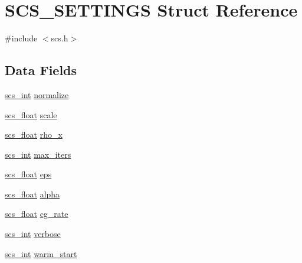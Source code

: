 \hypertarget{struct_s_c_s___s_e_t_t_i_n_g_s}{\section{S\-C\-S\-\_\-\-S\-E\-T\-T\-I\-N\-G\-S Struct Reference}
\label{struct_s_c_s___s_e_t_t_i_n_g_s}
}


{\ttfamily \#include $<$scs.\-h$>$}

\subsection*{Data Fields}
\begin{DoxyCompactItemize}
\item 
\hyperlink{glbopts_8h_a23c48a83ce0c58783595ad45ffcaf76b}{scs\-\_\-int} \hyperlink{struct_s_c_s___s_e_t_t_i_n_g_s_a2f2deca4a4fe625934880f425c3a3375}{normalize}
\item 
\hyperlink{glbopts_8h_ad37836e6404bb2c3ae8adcc6290699b9}{scs\-\_\-float} \hyperlink{struct_s_c_s___s_e_t_t_i_n_g_s_ab2b6a1ce51f2136cd86fa83c556115db}{scale}
\item 
\hyperlink{glbopts_8h_ad37836e6404bb2c3ae8adcc6290699b9}{scs\-\_\-float} \hyperlink{struct_s_c_s___s_e_t_t_i_n_g_s_aaf8bbb4248e038a2d12aca22175cf378}{rho\-\_\-x}
\item 
\hyperlink{glbopts_8h_a23c48a83ce0c58783595ad45ffcaf76b}{scs\-\_\-int} \hyperlink{struct_s_c_s___s_e_t_t_i_n_g_s_ab85a3495a03980ebb813b017fef244e0}{max\-\_\-iters}
\item 
\hyperlink{glbopts_8h_ad37836e6404bb2c3ae8adcc6290699b9}{scs\-\_\-float} \hyperlink{struct_s_c_s___s_e_t_t_i_n_g_s_af831b18f2e8eea852b3eec22b7413c49}{eps}
\item 
\hyperlink{glbopts_8h_ad37836e6404bb2c3ae8adcc6290699b9}{scs\-\_\-float} \hyperlink{struct_s_c_s___s_e_t_t_i_n_g_s_a844e3c29e5e72550896d01c9ca745081}{alpha}
\item 
\hyperlink{glbopts_8h_ad37836e6404bb2c3ae8adcc6290699b9}{scs\-\_\-float} \hyperlink{struct_s_c_s___s_e_t_t_i_n_g_s_a4549b5528b3b3ed290427b36e737ea13}{cg\-\_\-rate}
\item 
\hyperlink{glbopts_8h_a23c48a83ce0c58783595ad45ffcaf76b}{scs\-\_\-int} \hyperlink{struct_s_c_s___s_e_t_t_i_n_g_s_a6f332a476fcf237bfc3ebc99124a24ae}{verbose}
\item 
\hyperlink{glbopts_8h_a23c48a83ce0c58783595ad45ffcaf76b}{scs\-\_\-int} \hyperlink{struct_s_c_s___s_e_t_t_i_n_g_s_a38a4b68bc0363f4dd0737ae5621388ae}{warm\-\_\-start}

\end{DoxyCompactItemize}
